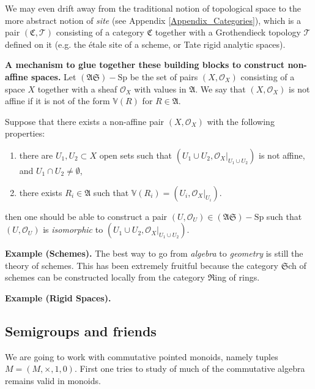 \documentclass{article}
\begin{document}
We may even drift away from the traditional notion of topological space to the more abstract notion of {\it site} (see Appendix \ref{Appendix_Categories}), which is a pair $(\mathfrak{C},\mathcal{T})$ consisting of a category $\mathfrak{C}$ together with a Grothendieck topology $\mathcal{T}$ defined on it (e.g. the \'etale site of a scheme, or Tate rigid analytic spaces). 

\medskip
{\bf A mechanism to glue together these building blocks to construct non-affine spaces. }Let $(\mathfrak{A}\mathfrak{S})-\text{Sp}$ be the set of pairs $(X,\mathcal{O}_X)$ consisting of a space $X$ together with a sheaf $\mathcal{O}_X$ with values in $\mathfrak{A}$. We say that $(X,\mathcal{O}_X)$ is not affine if it is not of the form $\mathbb{V}(R)$ for $R\in\mathfrak{A}$.

\medskip
Suppose that there exists a non-affine pair  $(X,\mathcal{O}_X)$  with the following properties: 

\begin{enumerate}
\item there are $U_1,U_2\subset X$ open sets such that $(U_1\cup U_2,\mathcal{O}_X|_{U_1\cup U_2})$ is not affine, and $U_1\cap U_2\neq\emptyset$,
\item there exists $R_i\in \mathfrak{A}$ such that $\mathbb{V}(R_i)=(U_i,\mathcal{O}_X|_{U_i})$.
\end{enumerate}

then one should be able to construct a pair $(U,\mathcal{O}_U)\in (\mathfrak{A}\mathfrak{S})-\text{Sp}$   such that $(U,\mathcal{O}_U)$ is {\it isomorphic} to $(U_1\cup U_2,\mathcal{O}_X|_{U_1\cup U_2})$.
 

 
\textbf{Example (Schemes). } The best  way to go from {\it algebra} to {\it geometry} is still the theory of schemes. This has been extremely fruitful because the category $\mathfrak{S}$ch of schemes can be constructed locally from the category $\mathfrak{R}$ing of rings. 

\textbf{Example (Rigid Spaces). }

\subsection{Semigroups and friends}

We are going to work with commutative pointed monoids, namely tuples $M=(M,\times,1,0)$. First one tries to study of much of the  commutative algebra remains valid in monoids.
\end{document}
